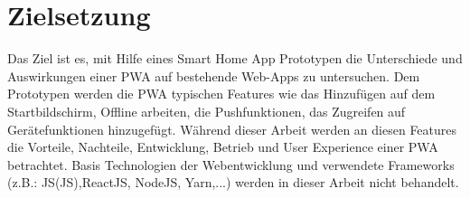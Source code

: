 \newpage
\section{Zielsetzung}\label{sub:Zielsetzung}
Das Ziel  ist es, mit Hilfe eines Smart Home App Prototypen die Unterschiede und Auswirkungen einer \acs{PWA} auf bestehende \acs{Web-App}s zu untersuchen.  
Dem Prototypen werden die \acs{PWA} typischen Features wie das Hinzufügen auf dem Startbildschirm, Offline arbeiten, die Pushfunktionen, 
das Zugreifen auf Gerätefunktionen hinzugefügt. 
Während dieser Arbeit werden an diesen Features die Vorteile, Nachteile, Entwicklung, Betrieb und User Experience einer \acl{PWA} betrachtet.
Basis Technologien der Webentwicklung und verwendete Frameworks (z.B.: \acl{JS}(\acs{JS}),ReactJS, NodeJS, Yarn,...) werden in dieser Arbeit nicht behandelt.
